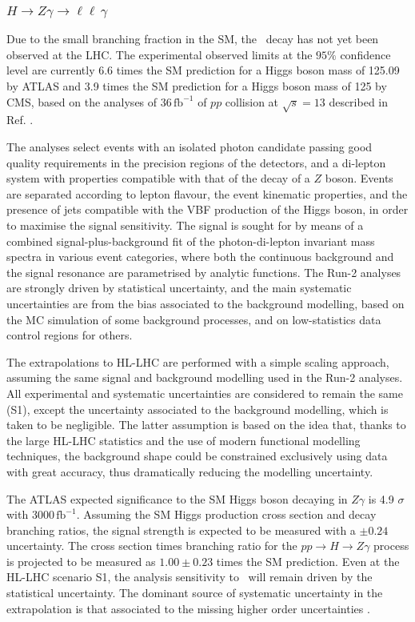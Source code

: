 \subsubsection{$H \to Z\gamma \to \ell\ell\,\gamma$}

Due to the small branching fraction in the SM, the \HZy\ decay has not yet been observed at the LHC. The experimental observed limits at the $95\%$ confidence level are currently 6.6 times the SM prediction for a Higgs boson mass of 125.09 \UGeV by ATLAS and 3.9 times the SM prediction for a Higgs boson mass of 125 \UGeV by CMS, based on the analyses of 36\,$\mathrm{fb}^{-1}$ of $pp$ collision at $\sqrt{s} = 13$ \UTeV described in Ref. \cite{Aaboud:2017uhw, Sirunyan:2018tbk}.

The analyses select events with an isolated photon candidate passing good quality requirements in the precision regions of the detectors, and a di-lepton system with properties compatible with that of the decay of a $Z$ boson. Events are separated according to lepton flavour, the event kinematic properties, and the presence of jets compatible with the VBF production of the Higgs boson, in order to maximise the signal sensitivity. The signal is sought for by means of a combined signal-plus-background fit of the photon-di-lepton invariant mass spectra in various event categories, where both the continuous background and the signal resonance are parametrised by analytic functions. The Run-2 analyses are strongly driven by statistical uncertainty, and the main systematic uncertainties are from the bias associated to the background modelling, based on the MC simulation of some background processes, and on low-statistics data control regions for others.

The extrapolations to HL-LHC are performed with a simple scaling approach, assuming the same signal and background modelling used in the Run-2 analyses. All experimental and systematic uncertainties are considered to remain the same (S1), except the uncertainty associated to the background modelling, which is taken to be negligible. The latter assumption is based on the idea that, thanks to the large HL-LHC statistics and the use of modern functional modelling techniques, the background shape could be constrained exclusively using data with great accuracy, thus dramatically reducing the modelling uncertainty.

The ATLAS expected significance to the SM Higgs boson decaying in $Z\gamma$ is 4.9 $\sigma$ with 3000\,$\mathrm{fb}^{-1}$. Assuming the SM Higgs production cross section and decay branching ratios, the signal strength is expected to be measured with a $\pm0.24$ uncertainty. The cross section times branching ratio for the $pp\rightarrow H \rightarrow Z\gamma$ process is projected to be measured as $1.00\pm0.23$ times the SM prediction. Even at the HL-LHC scenario S1, the analysis sensitivity  to \HZy\ will remain driven by the statistical uncertainty. The dominant source of systematic uncertainty in the extrapolation is that associated to the 
missing higher order uncertainties \cite{ATL-PHYS-PUB-2018-054}.

